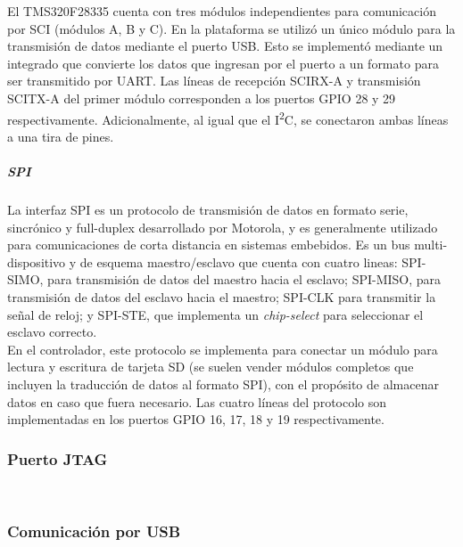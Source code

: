 El TMS320F28335 cuenta con tres módulos independientes para comunicación por SCI (módulos A, B y C). En la plataforma se utilizó un único módulo para la transmisión de datos mediante el puerto USB. Esto se implementó mediante un integrado que convierte los datos que ingresan por el puerto a un formato para ser transmitido por UART. Las líneas de recepción SCIRX-A y transmisión SCITX-A del primer módulo corresponden a los puertos GPIO 28 y 29 respectivamente. Adicionalmente, al igual que el I\textsuperscript{2}C, se conectaron ambas líneas a una tira de pines.\\

\subparagraph{SPI}

La interfaz SPI es un protocolo de transmisión de datos en formato serie, sincrónico y full-duplex desarrollado por Motorola, y es generalmente utilizado para comunicaciones de corta distancia en sistemas embebidos. Es un bus multi-dispositivo y de esquema maestro/esclavo que cuenta con cuatro lineas: SPI-SIMO, para transmisión de datos del maestro hacia el esclavo; SPI-MISO, para transmisión de datos del esclavo hacia el maestro; SPI-CLK para transmitir la señal de reloj; y SPI-STE, que implementa un \textit{chip-select} para seleccionar el esclavo correcto.\\

En el controlador, este protocolo se implementa para conectar un módulo para lectura y escritura de tarjeta SD (se suelen vender módulos completos que incluyen la traducción de datos al formato SPI), con el propósito de almacenar datos en caso que fuera necesario. Las cuatro líneas del protocolo son implementadas en los puertos GPIO 16, 17, 18 y 19 respectivamente.\\

\subsubsection{Puerto JTAG}

\lipsum[1]\\

\subsubsection{Comunicación por USB}

\lipsum[2]\\

